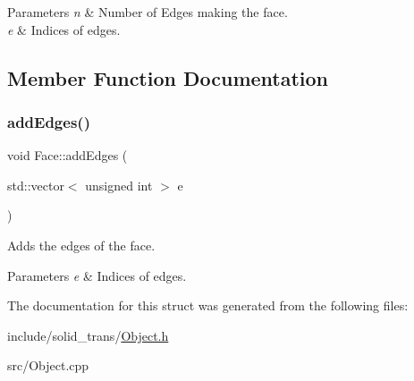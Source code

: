 \begin{DoxyParams}{Parameters}
{\em n} & Number of Edges making the face. \\
\hline
{\em e} & Indices of edges. \\
\hline
\end{DoxyParams}


\subsection{Member Function Documentation}
\mbox{\label{structFace_a8922fa75e52752067106a191c74da79c}} 
\subsubsection{\texorpdfstring{add\+Edges()}{addEdges()}}
{\footnotesize\ttfamily void Face\+::add\+Edges (\begin{DoxyParamCaption}\item[{std\+::vector$<$ unsigned int $>$}]{e }\end{DoxyParamCaption})}



Adds the edges of the face. 


\begin{DoxyParams}{Parameters}
{\em e} & Indices of edges. \\
\hline
\end{DoxyParams}


The documentation for this struct was generated from the following files\+:\begin{DoxyCompactItemize}
\item 
include/solid\+\_\+trans/\hyperlink{Object_8h}{Object.\+h}\item 
src/Object.\+cpp\end{DoxyCompactItemize}
